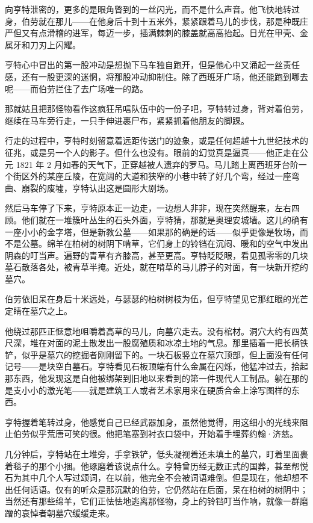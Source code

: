 \documentclass[AutoFakeBold=true]{book}
\begin{document}
向亨特泄密的，更多的是眼角瞥到的一丝闪光，而不是什么声音。他飞快地转过身，伯劳就在那儿——在他身后十到十五米外，紧紧跟着马儿的步伐，那是种既庄严但又有点滑稽的进军，每迈一步，插满棘刺的膝盖就高高抬起。日光在甲壳、金属牙和刀刃上闪耀。

亨特心中冒出的第一股冲动是想抛下马车独自跑开，但是他心中又涌起一丝责任感，还有一股更深的迷惘，将那股冲动抑制住。除了西班牙广场，他还能跑到哪去呢——而伯劳拦住了去广场唯一的路。

那就姑且把那怪物看作这疯狂吊唁队伍中的一份子吧，亨特转过身，背对着伯劳，继续在马车旁行走，一只手伸进裹尸布，紧紧抓着他朋友的脚踝。

行走的过程中，亨特时刻留意着远距传送门的迹象，或是任何超越十九世纪技术的征兆，或是另一个人的影子。但什么也没有。眼前的幻觉真是逼真——他正走在公元 1821 年 2 月如春的天气下，正穿越被人遗弃的罗马。马儿踏上离西班牙台阶一个街区外的某座丘陵，在宽阔的大道和狭窄的小巷中转了好几个弯，经过一座弯曲、崩裂的废墟，亨特认出这是圆形大剧场。

然后马车停了下来，亨特原本正一边走，一边想人非非，现在突然醒来，左右四顾。他们就在一堆簇叶丛生的石头外面，亨特猜，那就是奥理安城墙。这儿的确有一座小小的金字塔，但是新教公墓——如果那的确是的话——似乎更像是牧场，而不是公墓。绵羊在柏树的树阴下啃草，它们身上的铃铛在沉闷、暖和的空气中发出阴森的叮当声。遍野的青草有齐膝高，甚至更高。亨特眨眨眼，看见孤零零的几块墓石散落各处，被青草半掩。近处，就在啃草的马儿脖子的对面，有一块新开挖的墓穴。

伯劳依旧呆在身后十米远处，与瑟瑟的柏树树枝为伍，但亨特望见它那红眼的光芒定睛在墓穴之上。

他绕过那匹正惬意地咀嚼着高草的马儿，向墓穴走去。没有棺材。洞穴大约有四英尺深，堆在对面的泥土散发出一股腐殖质和冰凉土地的气息。那里插着一把长柄铁铲，似乎是墓穴的挖掘者刚刚留下的。一块石板竖立在墓穴顶部，但上面没有任何记号——是块空白墓石。亨特看见石板顶端有什么金属在闪烁，他猛冲过去，拾起那东西，他发现这是自他被绑架到旧地以来看到的第一件现代人工制品。躺在那的是支小小的激光笔——就是建筑工人或者艺术家用来在硬质合金上涂写图样的东西。

亨特握着笔转过身，他感觉自己已经武器加身，虽然他觉得，用这细小的光线来阻止伯劳似乎荒唐可笑的很。他把笔塞到衬衣口袋中，开始着手埋葬约翰·济慈。

几分钟后，亨特站在土堆旁，手拿铁铲，低头凝视着还未填土的墓穴，盯着里面裹着毯子的那个小捆。他琢磨着该说点什么。亨特曾历经无数正式的国葬，甚至帮悦石为其中几个人写过颂词，在以前，他完全不会被词语难倒。但是现在，他却想不出任何话语。仅有的听众是那沉默的伯劳，它仍然站在后面，呆在柏树的树阴中；当然还有那些绵羊，它们正怯怯地逃离那怪物，身上的铃铛叮当作响，就像一群磨蹭的哀悼者朝墓穴缓缓走来。
\end{document}
